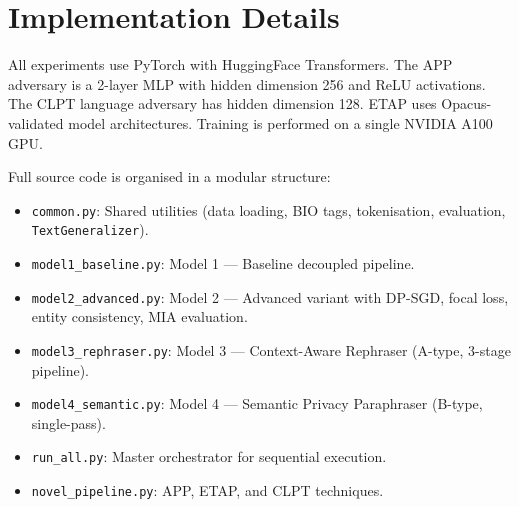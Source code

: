 \documentclass[11pt,a4paper]{article}
\begin{document}
\section{Implementation Details}
\label{app:implementation}

All experiments use PyTorch with HuggingFace Transformers.  The APP adversary
is a 2-layer MLP with hidden dimension 256 and ReLU activations.  The CLPT
language adversary has hidden dimension 128.  ETAP uses Opacus-validated model
architectures.  Training is performed on a single NVIDIA A100 GPU.

Full source code is organised in a modular structure:
\begin{itemize}
    \item \texttt{common.py}: Shared utilities (data loading, BIO tags,
    tokenisation, evaluation, \texttt{TextGeneralizer}).
    \item \texttt{model1\_baseline.py}: Model 1 — Baseline decoupled pipeline.
    \item \texttt{model2\_advanced.py}: Model 2 — Advanced variant with DP-SGD,
    focal loss, entity consistency, MIA evaluation.
    \item \texttt{model3\_rephraser.py}: Model 3 — Context-Aware Rephraser
    (A-type, 3-stage pipeline).
    \item \texttt{model4\_semantic.py}: Model 4 — Semantic Privacy Paraphraser
    (B-type, single-pass).
    \item \texttt{run\_all.py}: Master orchestrator for sequential execution.
    \item \texttt{novel\_pipeline.py}: APP, ETAP, and CLPT techniques.
\end{itemize}
\end{document}
